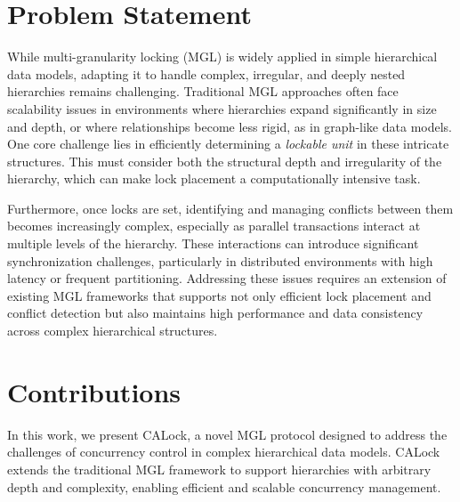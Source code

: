 

\section{Problem Statement}
While multi-granularity locking (MGL) is widely applied in simple hierarchical data models, adapting it to handle complex, irregular, and deeply nested hierarchies remains challenging. Traditional MGL approaches often face scalability issues in environments where hierarchies expand significantly in size and depth, or where relationships become less rigid, as in graph-like data models. One core challenge lies in efficiently determining a \emph{lockable unit} in these intricate structures. 
This must consider both the structural depth and irregularity of the hierarchy, which can make lock placement a computationally intensive task.

Furthermore, once locks are set, identifying and managing conflicts between them becomes increasingly complex, especially as parallel transactions interact at multiple levels of the hierarchy. These interactions can introduce significant synchronization challenges, particularly in distributed environments with high latency or frequent partitioning. Addressing these issues requires an extension of existing MGL frameworks that supports not only efficient lock placement and conflict detection but also maintains high performance and data consistency across complex hierarchical structures.


\section{Contributions}

In this work, we present CALock, a novel MGL protocol designed to address the challenges of concurrency control in complex hierarchical data models. CALock extends the traditional MGL framework to support hierarchies with arbitrary depth and complexity, enabling efficient and scalable concurrency management.

